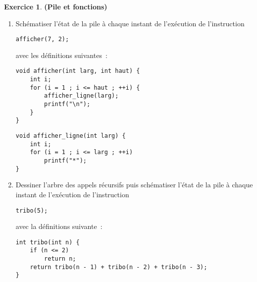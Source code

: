 \documentclass[12pt]{article}
\theoremstyle{definition}
\newtheorem{Exercice}{Exercice}
\begin{document}
\begin{Exercice} {\bf (Pile et fonctions)}\smallskip

\begin{enumerate}
    \item Schématiser l'état de la pile à chaque instant de l'exécution
    de l'instruction
    \begin{lstlisting}
afficher(7, 2);
    \end{lstlisting}
    avec les définitions suivantes~:
    \begin{multicols}{2}
\begin{lstlisting}
void afficher(int larg, int haut) {
    int i;
    for (i = 1 ; i <= haut ; ++i) {
        afficher_ligne(larg);
        printf("\n");
    }
}
\end{lstlisting}
\begin{lstlisting}
void afficher_ligne(int larg) {
    int i;
    for (i = 1 ; i <= larg ; ++i)
        printf("*");
}
\end{lstlisting}
    \end{multicols}
    \smallskip

    \item Dessiner l'arbre des appels récursifs puis schématiser l'état 
    de la pile à chaque instant de l'exécution de l'instruction
    \begin{lstlisting}
tribo(5);
    \end{lstlisting}
    avec la définitions suivante~:
\begin{lstlisting}
int tribo(int n) {
    if (n <= 2)
        return n;
    return tribo(n - 1) + tribo(n - 2) + tribo(n - 3);
}
\end{lstlisting}
\end{enumerate}
\end{Exercice}
\bigskip
\end{document}
